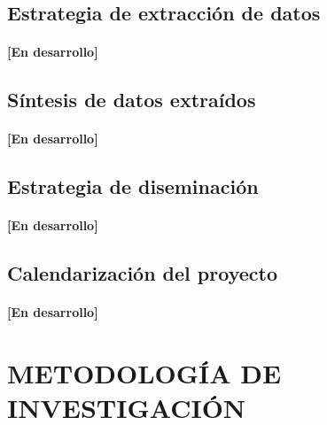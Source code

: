 \documentclass[10pt, twocolumn]{article}
\begin{document}
\subsection{Estrategia de extracción de datos}
\paragraph{[En desarrollo]}

\subsection{Síntesis de datos extraídos}
\paragraph{[En desarrollo]}

\subsection{Estrategia de diseminación}
\paragraph{[En desarrollo]}

\subsection{Calendarización del proyecto}
\paragraph{[En desarrollo]}

\section{METODOLOGÍA DE INVESTIGACIÓN}
\end{document}
